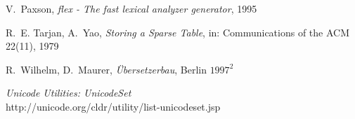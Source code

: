 \documentclass[11pt]{scrartcl}
\newcommand{\trit}{\em}
\begin{document}
\begin{thebibliography}{[00]}
 V.~Paxson, {\trit flex - The fast lexical analyzer generator}, 1995

  R.~E. Tarjan, A.~Yao, {\trit Storing a Sparse Table}, in: Communications of the ACM 22(11), 1979 

  R.~Wilhelm, D.~Maurer, {\trit {\"U}bersetzerbau}, Berlin $1997^2$

  {\trit Unicode Utilities: UnicodeSet}\\ 
                     {http://unicode.org/cldr/utility/list-unicodeset.jsp}


\end{thebibliography}
\end{document}
